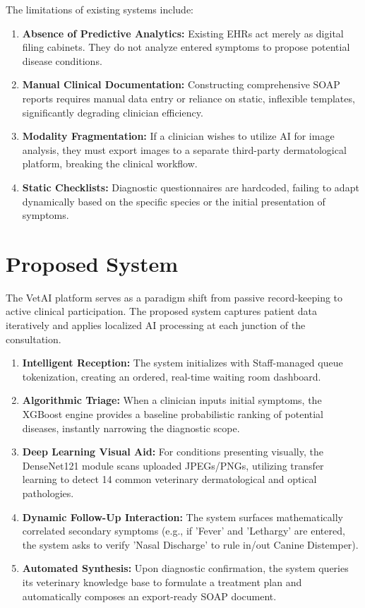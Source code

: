 \documentclass[a4paper,12pt]{report}
\begin{document}
The limitations of existing systems include:
\begin{enumerate}
    \item \textbf{Absence of Predictive Analytics:} Existing EHRs act merely as digital filing cabinets. They do not analyze entered symptoms to propose potential disease conditions.
    \item \textbf{Manual Clinical Documentation:} Constructing comprehensive SOAP reports requires manual data entry or reliance on static, inflexible templates, significantly degrading clinician efficiency.
    \item \textbf{Modality Fragmentation:} If a clinician wishes to utilize AI for image analysis, they must export images to a separate third-party dermatological platform, breaking the clinical workflow.
    \item \textbf{Static Checklists:} Diagnostic questionnaires are hardcoded, failing to adapt dynamically based on the specific species or the initial presentation of symptoms.
\end{enumerate}

\section{Proposed System}

The VetAI platform serves as a paradigm shift from passive record-keeping to active clinical participation. The proposed system captures patient data iteratively and applies localized AI processing at each junction of the consultation.

\begin{enumerate}
    \item \textbf{Intelligent Reception:} The system initializes with Staff-managed queue tokenization, creating an ordered, real-time waiting room dashboard.
    \item \textbf{Algorithmic Triage:} When a clinician inputs initial symptoms, the XGBoost engine provides a baseline probabilistic ranking of potential diseases, instantly narrowing the diagnostic scope.
    \item \textbf{Deep Learning Visual Aid:} For conditions presenting visually, the DenseNet121 module scans uploaded JPEGs/PNGs, utilizing transfer learning to detect 14 common veterinary dermatological and optical pathologies.
    \item \textbf{Dynamic Follow-Up Interaction:} The system surfaces mathematically correlated secondary symptoms (e.g., if 'Fever' and 'Lethargy' are entered, the system asks to verify 'Nasal Discharge' to rule in/out Canine Distemper).
    \item \textbf{Automated Synthesis:} Upon diagnostic confirmation, the system queries its veterinary knowledge base to formulate a treatment plan and automatically composes an export-ready SOAP document.
\end{enumerate}
\end{document}
